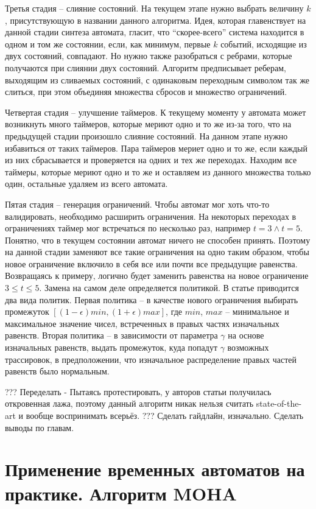 \documentclass[times,specification,annotation]{itmo-student-thesis}
\begin{document}
Третья стадия -- слияние состояний. На текущем этапе нужно выбрать величину $k$, присутствующую в названии данного алгоритма. Идея, которая главенствует на данной стадии синтеза автомата,
гласит, что ``скорее-всего'' система находится в одном и том же состоянии, если, как минимум, первые $k$ событий, исходящие из двух состояний, совпадают. Но нужно также разобраться с ребрами, которые
получаются при слиянии двух состояний. Алгоритм предписывает реберам, выходящим из сливаемых состояний, с одинаковым переходным символом так же слиться, при этом объединяя множества сбросов и
множество ограничений. 

Четвертая стадия -- улучшение таймеров. К текущему моменту у автомата может возникнуть много таймеров, которые мериют одно и то же из-за того, что на предыдущей стадии произошло слияние состояний.
На данном этапе нужно избавиться от таких таймеров. Пара таймеров мериет одно и то же, если каждый из них сбрасывается и проверяется на одних и тех же переходах. Находим все таймеры, которые мериют
одно и то же и оставляем из данного множества только один, остальные удаляем из всего автомата.

Пятая стадия -- генерация ограничений. Чтобы автомат мог хоть что-то валидировать, необходимо расширить ограничения. На некоторых переходах в ограничениях таймер мог встречаться по несколько раз, 
например $t = 3 \land t = 5$. Понятно, что в текущем состоянии автомат ничего не способен принять. Поэтому на данной стадии заменяют все такие ограничения на одно таким образом, чтобы новое ограничение
включило в себя все или почти все предыдущие равенства. Возвращаясь к примеру, логично будет заменить равенства на новое ограничение $3 \leq t \leq 5$. Замена на самом деле определяется политикой.
В статье приводится два вида политик. Первая политика -- в качестве нового ограничения выбирать промежуток $[(1-\epsilon)min, (1+\epsilon)max]$, где $min$, $max$ -- минимальное
и максимальное значение чисел, встреченных в правых частях изначальных равенств. Вторая политика -- в зависимости от параметра $\gamma$
на основе изначальных равенств, выдать промежуток, куда попадут $\gamma$ возможных трассировок, в предположении, что изначальное распределение правых частей равенств было нормальным.

??? Переделать - Пытаясь протестировать, у авторов статьи получилась откровенная лажа, поэтому данный алгоритм никак нельзя считать state-of-the-art и вообще воспринимать всерьёз.
??? Сделать гайдлайн, изначально. Сделать выводы по главам.

\section{Применение временных автоматов на практике. Алгоритм MOHA}
\end{document}
